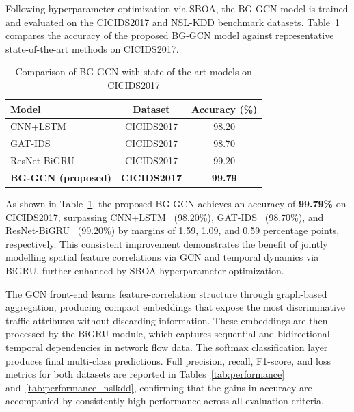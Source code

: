 \documentclass[a4paper,fleqn]{cas-sc}
\begin{document}
Following hyperparameter optimization via SBOA, the BG-GCN model is trained and evaluated on the CICIDS2017 and NSL-KDD benchmark datasets. Table~\ref{tab:soa_comparison} compares the accuracy of the proposed BG-GCN model against representative state-of-the-art methods on CICIDS2017.

\begin{table}[htbp]
\caption{Comparison of BG-GCN with state-of-the-art models on CICIDS2017}\label{tab:soa_comparison}
\centering
\begin{tabular}{@{}lcc@{}}
\toprule
Model & Dataset & Accuracy (\%) \\
\midrule
CNN+LSTM~\cite{bib13}          & CICIDS2017 & 98.20 \\
GAT-IDS~\cite{bib9}            & CICIDS2017 & 98.70 \\
ResNet-BiGRU~\cite{bib14}      & CICIDS2017 & 99.20 \\
\midrule
\textbf{BG-GCN (proposed)}     & \textbf{CICIDS2017} & \textbf{99.79} \\
        \bottomrule
\end{tabular}
\end{table}

As shown in Table~\ref{tab:soa_comparison}, the proposed BG-GCN achieves an accuracy of \textbf{99.79\%} on CICIDS2017, surpassing CNN+LSTM~\cite{bib13} (98.20\%), GAT-IDS~\cite{bib9} (98.70\%), and ResNet-BiGRU~\cite{bib14} (99.20\%) by margins of 1.59, 1.09, and 0.59 percentage points, respectively. This consistent improvement demonstrates the benefit of jointly modelling spatial feature correlations via GCN and temporal dynamics via BiGRU, further enhanced by SBOA hyperparameter optimization.

The GCN front-end learns feature-correlation structure through graph-based aggregation, producing compact embeddings that expose the most discriminative traffic attributes without discarding information. These embeddings are then processed by the BiGRU module, which captures sequential and bidirectional temporal dependencies in network flow data. The softmax classification layer produces final multi-class predictions. Full precision, recall, F1-score, and loss metrics for both datasets are reported in Tables~\ref{tab:performance} and~\ref{tab:performance_nslkdd}, confirming that the gains in accuracy are accompanied by consistently high performance across all evaluation criteria.
\end{document}
